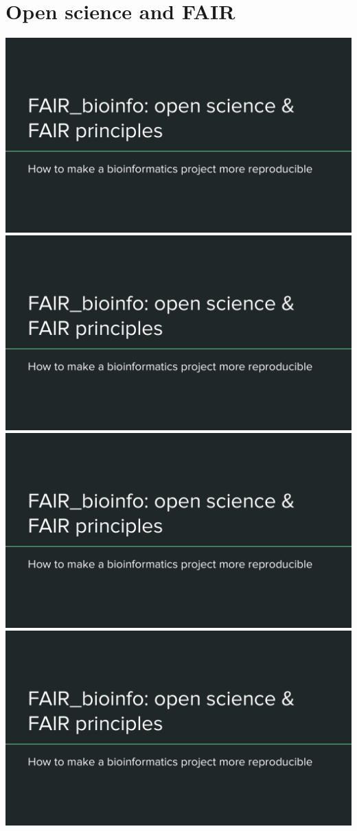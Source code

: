 \section{Open science and FAIR}

\includegraphics[page=8,scale=0.55]{01_OS_and_FAIR_intro.pdf}
\includegraphics[page=8,scale=0.55]{01_OS_and_FAIR_intro.pdf}
\includegraphics[page=9,scale=0.55]{01_OS_and_FAIR_intro.pdf}
\includegraphics[page=10,scale=0.55]{01_OS_and_FAIR_intro.pdf}
